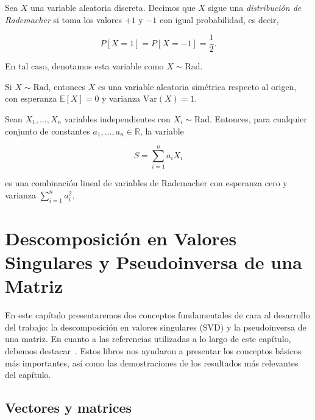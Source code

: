 \begin{definicion}
    Sea $X$ una variable aleatoria discreta. Decimos que $X$ sigue una \emph{distribución de Rademacher} si toma los valores $+1$ y $-1$ con igual probabilidad, es decir,

    \[
        P[X = 1] = P[X = -1] = \frac{1}{2}.
    \]

    En tal caso, denotamos esta variable como $X \sim \text{Rad}$.
\end{definicion}

\begin{proposicion}
    Si $X \sim \text{Rad}$, entonces $X$ es una variable aleatoria simétrica respecto al origen, con esperanza $\mathbb{E}[X] = 0$ y varianza $\text{Var}(X) = 1$.\newline
\end{proposicion}

\begin{proposicion}
    Sean $X_1, \dots, X_n$ variables independientes con $X_i \sim \text{Rad}$. Entonces, para cualquier conjunto de constantes $a_1, \dots, a_n \in \mathbb{R}$, la variable

    \[
        S = \sum_{i=1}^n a_i X_i
    \]

    es una combinación lineal de variables de Rademacher con esperanza cero y varianza $\sum_{i=1}^n a_i^2$.
\end{proposicion}


\chapter{Descomposición en Valores Singulares y Pseudoinversa de una Matriz}\label{ch:descomposicion-valores-singulares-pseudoinversa}

En este capítulo presentaremos dos conceptos fundamentales de cara al desarrollo del trabajo: la descomposición en valores singulares (SVD) y la pseudoinversa de una matriz. En cuanto a las referencias utilizadas a lo largo de este capítulo, debemos destacar~\cite{Friedberg2014linear, Strang2023, Poole2011}. Estos libros nos ayudaron a presentar los conceptos básicos más importantes, así como las demostraciones de los resultados más relevantes del capítulo.

\section{Vectores y matrices}\label{sec:vectores-matrices}

